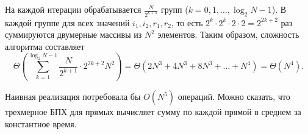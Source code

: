 На каждой итерации обрабатывается $\frac{N}{2^{k+1}}$ групп ($k=0, 1, \dots, \log_2 N - 1$). В каждой группе для всех значений $i_1, i_2, r_1, r_2$, то есть $2^{k} \cdot 2^{k} \cdot 2 \cdot 2 = 2^{2k+2}$ раз суммируются двумерные массивы из $N^2$ элементов. Таким образом, сложность алгоритма составляет
\begin{equation}
\label{complexity-fht-3d-lines}
    \Theta\left( \sum_{k=1}^{\log_2 N - 1} \frac{N}{2^{k+1}} \cdot 2^{2k+2} N^2 \right) =
    \Theta\left( 2N^3 + 4N^3 + 8N^3 + \dots + N^4 \right) =
    \Theta\left( N^4 \right).
\end{equation}

Наивная реализация потребовала бы $O(N^5)$ операций. Можно сказать, что трехмерное БПХ для прямых вычисляет сумму по каждой прямой в среднем за константное время.





